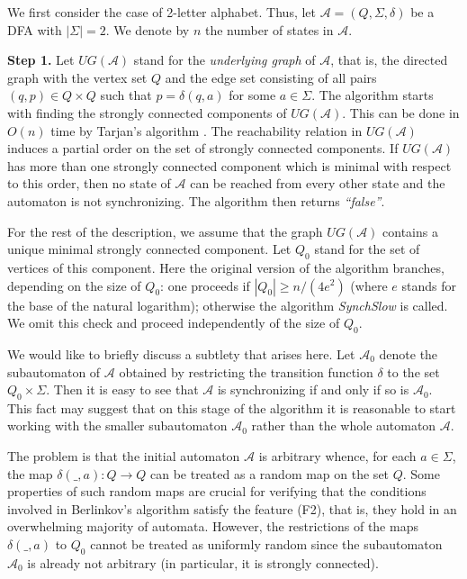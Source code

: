 \documentclass{jalc}
\begin{document}
We first consider the case of 2-letter alphabet. Thus, let $\mathcal{A}=(Q, \Sigma, \delta)$  be a DFA with $|\Sigma|=2$. We denote by $n$ the number of states in $\mathcal{A}$.

\smallskip

\textbf{Step 1.} Let $U\!G(\mathcal{A})$ stand for the \emph{underlying graph} of $\mathcal{A}$, that is, the directed graph with the vertex set $Q$ and the edge set consisting of all pairs $(q,p)\in Q\times Q$ such that $p=\delta(q,a)$ for some $a \in \Sigma$. The algorithm starts with finding the strongly connected components of $U\!G(\mathcal{A})$. This can be done in $O(n)$ time by Tarjan's algorithm \cite{Tarjan:72}. The reachability relation in $U\!G(\mathcal{A})$ induces a partial order on the set of strongly connected components. If $U\!G(\mathcal{A})$ has more than one strongly connected component which is minimal with respect to this order, then no state of $\mathcal{A}$ can be reached from every other state and the automaton is not synchronizing. The algorithm then returns \emph{``false''}.

For the rest of the description, we assume that the graph $U\!G(\mathcal{A})$ contains a unique minimal strongly connected component. Let $Q_0$ stand for the set of vertices of this component. Here the original version of the algorithm branches, depending on the size of $Q_0$: one proceeds if $|Q_0|\ge n/(4e^2)$ (where $e$ stands for the base of the natural logarithm); otherwise the algorithm \emph{SynchSlow} is called. We omit this check and proceed independently of the size of $Q_0$.

\begin{remark}
\label{rem:scc}
We would like to briefly discuss a subtlety that arises here. Let $\mathcal{A}_0$ denote the subautomaton of $\mathcal{A}$ obtained by restricting the transition function $\delta$ to the set $Q_0\times\Sigma$. Then it is easy to see that $\mathcal{A}$ is synchronizing if and only if so is $\mathcal{A}_0$. This fact may suggest that on this stage of the algorithm it is reasonable to start working with the smaller subautomaton $\mathcal{A}_0$ rather than the whole automaton $\mathcal{A}$.

The problem is that the initial automaton $\mathcal{A}$ is arbitrary whence, for each $a\in\Sigma$, the map $\delta(\_,a)\colon Q\to Q$ can be treated as a random map on the set $Q$. Some properties of such random maps are crucial for verifying that the conditions involved in Berlinkov's algorithm satisfy the feature (F2), that is, they hold in an overwhelming majority of automata. However, the restrictions of the maps $\delta(\_,a)$ to $Q_0$ cannot be treated as uniformly random since the subautomaton $\mathcal{A}_0$ is already not arbitrary (in particular, it is strongly connected).
\end{remark}
\end{document}
